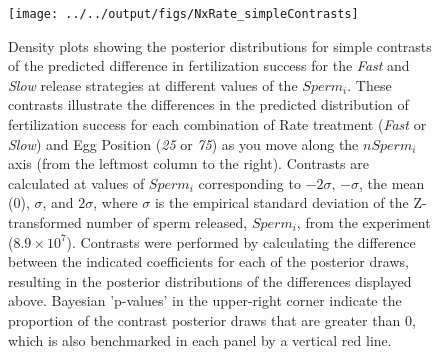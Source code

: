 \documentclass{article}
\newcommand{\code}{\fontfamily{pcr}\selectfont}
\begin{document}
\begin{figure}[!ht]
\texttt{[image: ../../output/figs/NxRate\_simpleContrasts]}
\caption{Density plots showing the posterior distributions for simple contrasts of the predicted difference in fertilization success for the \textit{Fast} and \textit{Slow} release strategies at different values of the $Sperm_i$. These contrasts illustrate the differences in the predicted distribution of fertilization success for each combination of Rate treatment (\textit{Fast} or \textit{Slow}) and Egg Position (\textit{25} or \textit{75}) as you move along the $nSperm_i$ axis (from the leftmost column to the right). Contrasts are calculated at values of $Sperm_i$ corresponding to $-2 \sigma$, $-\sigma$, the mean ($0$), $\sigma$, and $2 \sigma$, where $\sigma$ is the empirical standard deviation of the Z-transformed number of sperm released, $Sperm_i$, from the  experiment ($8.9 \times 10^{7}$). Contrasts were performed by calculating the difference between the indicated coefficients for each of the posterior draws, resulting in the posterior distributions of the differences displayed above. Bayesian 'p-values' in the upper-right corner indicate the proportion of the contrast posterior draws that are greater than $0$, which is also benchmarked in each panel by a vertical red line.}
\label{fig:simpContr}
\end{figure}
\newpage{}


%

%
%
%
%
%
%
%
\end{document}
